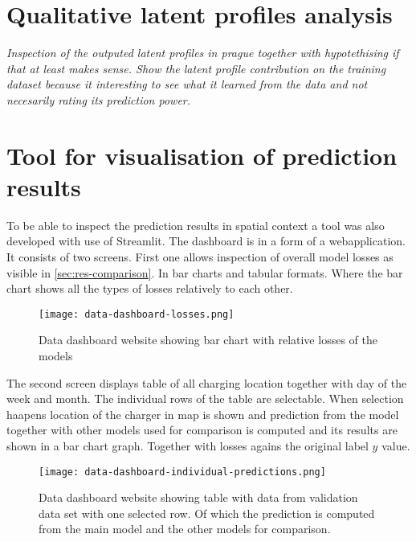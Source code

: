 \section{Qualitative latent profiles analysis}

\textit{Inspection of the outputed latent profiles in prague together with hypotethising if that at least makes sense. Show the latent profile contribution on the training dataset because it interesting to see what it learned from the data and not necesarily rating its prediction power.}

\section{Tool for visualisation of prediction results}
To be able to inspect the prediction results in spatial context a tool was also developed with use of Streamlit. The dashboard is in a form of a webapplication.
It consists of two screens.
First one allows inspection of overall model losses as visible in \ref{sec:res-comparison}. In bar charts and tabular formats. Where the bar chart shows all the types of losses relatively to each other.
\begin{figure}
    \texttt{[image: data-dashboard-losses.png]}
    \caption[]{Data dashboard website showing bar chart with relative losses of the models}
\end{figure}

The second screen displays table of all charging location together with day of the week and month. The individual rows of the table are selectable. When selection haapens location of the charger in map is shown and prediction from the model together with other models used for comparison is computed and its results are shown in a bar chart graph. Together with losses agains the original label $y$ value.

\begin{figure}
    \texttt{[image: data-dashboard-individual-predictions.png]}
    \caption[]{Data dashboard website showing table with data from validation data set with one selected row. Of which the prediction is computed from the main model and the other models for comparison.}
\end{figure}

